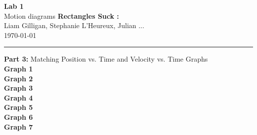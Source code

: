 \documentclass[12pt, letterpaper]{article}
\begin{document}
  \begin{titlepage} 
    \begin{center}
      \Huge{\textbf{Lab 1}}\\
      \Huge{Motion diagrams}
      \vfill
      \large{\textbf{Rectangles Suck :}}\\
      \large{Liam Gilligan, Stephanie L'Heureux, Julian ...}\\
      \vspace*{0.5cm}
      \normalsize
      \today
    \end{center}
  \end{titlepage}


  \begin{center}
    \rule{\textwidth}{0.5pt}
    \normalsize{\textbf{Part 3:} Matching Position vs. Time and Velocity vs. Time Graphs}\\
    \vspace{0.5cm}
    \textbf{Graph 1}\\
    \textbf{Graph 2}\\
    \textbf{Graph 3}\\
    \textbf{Graph 4}\\
    \textbf{Graph 5}\\
    \textbf{Graph 6}\\
    \textbf{Graph 7}\\
  \end{center}

\end{document}
